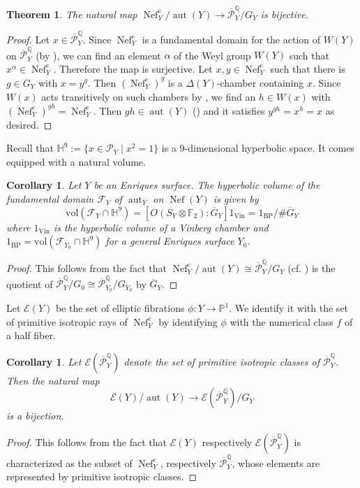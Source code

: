 \documentclass{amsart}
\theoremstyle{definition}
\theoremstyle{plain}
\newtheorem{theorem}[definition]{Theorem}
\newtheorem{corollary}[definition]{Corollary}
\DeclareMathOperator{\Nef}{Nef}
\DeclareMathOperator{\aut}{aut}
\newcommand{\FF}{\mathbb{F}}
\newcommand{\HH}{\mathbb{H}}
\newcommand{\E}{\mathcal{E}}
\newcommand{\F}{\mathcal{F}}
\renewcommand{\P}{\mathcal{P}}
\newcommand{\Gbar}{\overline{G}}
\newcommand{\Pbar}{\overline{\P}^\mathbb{Q}}
\begin{document}
\begin{theorem}\label{thm:NefmodAut}
The natural map $\Nef^{e}_Y / \aut(Y) \to \Pbar_Y/G_Y$ is bijective.
\end{theorem}
\begin{proof}
Let $x \in \Pbar_Y$. Since $\Nef^{e}_Y$ is a fundamental domain for the action of $W(Y)$ on $\Pbar_Y$ (by ), we can find an element $\alpha$ of the Weyl group $W(Y)$ such that $x^\alpha\in \Nef^{e}_Y$. Therefore the map is surjective.
Let $x, y \in \Nef^{e}_Y$ such that there is $g \in G_Y$ with $x=y^g$.
Then $(\Nef^{e}_Y)^g$ is a $\Delta(Y)$-chamber containing $x$. Since $W(x)$ acts transitively on such chambers by , we find an $h \in W(x)$ with
$(\Nef^{e}_Y)^{gh} = \Nef^{e}_Y$. Then $gh\in\aut(Y)$ () and it satisfies $y^{gh}=x^h=x$ as desired.
\end{proof}

Recall that $\HH^9 := \{x \in \P_Y \mid x^2=1\}$ is a $9$-dimensional hyperbolic space. It comes equipped with a natural volume.
\begin{corollary}\label{corollary:nefmodaut}
Let $Y$ be an Enriques surface.
The hyperbolic volume of the fundamental domain $\F_Y$ of $\aut_Y$ on $\Nef(Y)$ is given by
\[\mbox{vol}(\F_Y\cap \HH^9) = \left[O(S_Y \otimes \FF_2) : \Gbar_Y\right] 1_{\mathrm{Vin}}= 1_{\mathrm{BP}}/\#\Gbar_Y\]
where $1_{\mathrm{Vin}}$ is the hyperbolic volume of a Vinberg chamber and $1_{\mathrm{BP}}=\mbox{vol}(\F_{Y_0}\cap \HH^9)$ for a general Enriques surface $Y_0$.
\end{corollary}
\begin{proof}
This follows from the fact that $\Nef^e_Y/\aut(Y)\cong \Pbar_Y / G_Y$ (cf. ) is the quotient of $\Pbar_Y/G_0 \cong \Pbar_{Y_0}/G_{Y_0}$ by
$\Gbar_Y$.
\end{proof}


Let $\E(Y)$ be the set of elliptic fibrations $\phi\colon Y \to \mathbb{P}^1$. We identify it with the set of primitive isotropic rays of $\Nef^{e}_Y$ by identifying $\phi$ with the numerical class $f$ of a half fiber.

\begin{corollary}\label{cor:elliptic_bijection}
Let $\E(\Pbar_Y)$ denote the set of primitive isotropic classes of $\Pbar_Y$. Then the natural map
\[\E(Y) / \aut(Y) \to \E(\Pbar_Y)/G_Y\]
 is a bijection.
\end{corollary}
\begin{proof}
This follows from the fact that $\E(Y)$ respectively $\E(\Pbar_Y)$ is characterized as the subset of $\Nef^{e}_Y$, respectively $\Pbar_Y$, whose elements are represented by primitive isotropic classes.
\end{proof}
\end{document}
